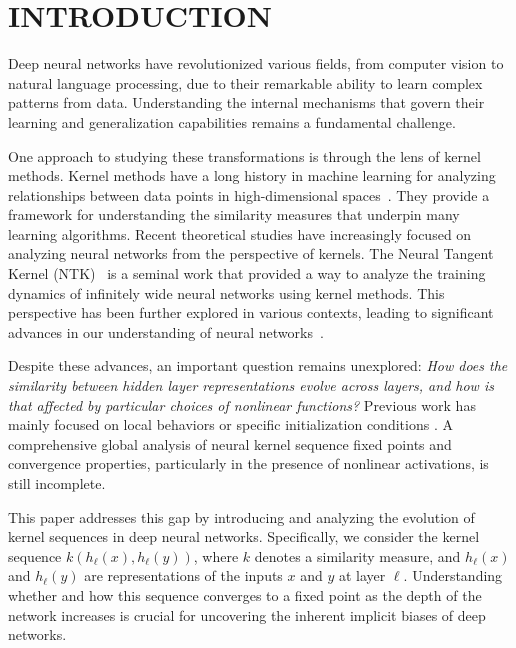 \documentclass[twoside]{article}
\theoremstyle{definition}
\begin{document}
\section{INTRODUCTION}
Deep neural networks have revolutionized various fields, from computer vision to natural language processing, due to their remarkable ability to learn complex patterns from data. Understanding the internal mechanisms that govern their learning and generalization capabilities remains a fundamental challenge. 

One approach to studying these transformations is through the lens of kernel methods. Kernel methods have a long history in machine learning for analyzing relationships between data points in high-dimensional spaces~\citep{scholkopf2002learning, smola2004tutorial}. They provide a framework for understanding the similarity measures that underpin many learning algorithms. Recent theoretical studies have increasingly focused on analyzing neural networks from the perspective of kernels. The Neural Tangent Kernel (NTK)~\citep{jacot2018neural} is a seminal work that provided a way to analyze the training dynamics of infinitely wide neural networks using kernel methods. This perspective has been further explored in various contexts, leading to significant advances in our understanding of neural networks~\citep{lee2019wide, arora2019exact, yang2019scaling}.

Despite these advances, an important question remains unexplored: \emph{How does the similarity between hidden layer representations evolve across layers, and how is that affected by particular choices of nonlinear functions?} Previous work has mainly focused on local behaviors or specific initialization conditions \citep{saxe2013exact, schoenholz2016deep, pennington2017resurrecting}. A comprehensive global analysis of neural kernel sequence fixed points and convergence properties, particularly in the presence of nonlinear activations, is still incomplete.

This paper addresses this gap by introducing and analyzing the evolution of kernel sequences in deep neural networks. Specifically, we consider the kernel sequence $ k (h_\ell (x), h_\ell (y)) $, where $ k$ denotes a similarity measure, and $ h_\ell (x) $ and $ h_\ell (y) $ are representations of the inputs $ x$ and $ y$ at layer $\ell$. Understanding whether and how this sequence converges to a fixed point as the depth of the network increases is crucial for uncovering the inherent implicit biases of deep networks.
\end{document}
